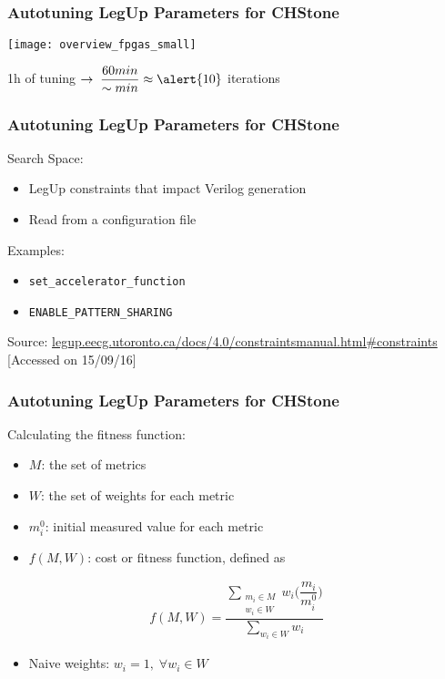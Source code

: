 \documentclass[10pt, compress, aspectratio=169, xcolor=table]{beamer}
\begin{document}
\begin{frame}
    \frametitle{Autotuning LegUp Parameters for CHStone}
    \begin{center}
        \texttt{[image: overview\_fpgas\_small]}

         \alert{1h} of tuning $\rightarrow \; \dfrac{60min}{\sim{}min} \approx \alert{10}$ \alert{iterations}
    \end{center}
\end{frame}

\begin{frame}
    \frametitle{Autotuning LegUp Parameters for CHStone}
    \alert{Search Space}:
    \begin{itemize}
        \item \alert{LegUp constraints} that impact \alert{Verilog generation}
        \item Read from a \alert{configuration file}
    \end{itemize}

    Examples:
    \begin{itemize}
        \item \texttt{set\_accelerator\_function}
        \item \texttt{ENABLE\_PATTERN\_SHARING}
    \end{itemize}

    \begin{center}
        \tiny{Source: \url{legup.eecg.utoronto.ca/docs/4.0/constraintsmanual.html\#constraints} [Accessed on 15/09/16]}
    \end{center}
\end{frame}

\begin{frame}
    \frametitle{Autotuning LegUp Parameters for CHStone}
    Calculating the \alert{fitness function}:

    \begin{itemize}
        \item $M$: the set of \alert{metrics}
        \item $W$: the set of \alert{weights for each metric}
        \item $m_{i}^{0}$: \alert{initial measured value} for each metric
        \item $f(M,W)$: \alert{cost} or \alert{fitness function}, defined as
    \end{itemize}
    \begin{align*}
        f(M, W) = \dfrac{\sum\limits_{\substack{m_i \in M \\ w_i \in W}}{w_i\Big(\dfrac{m_i}{m_{i}^{0}}\Big)}}{\sum\limits_{w_i \in W}{w_i}}
    \end{align*}
    \begin{itemize}
        \item \alert{Naive weights}: $w_i = 1, \; \forall w_i \in W$
    \end{itemize}
\end{frame}
\end{document}
